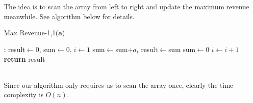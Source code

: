 \documentclass[12pt,letterpaper]{article}
\begin{document}
\section{}
\subsection{}
The idea is to scan the array from left to right and update the maximum revenue meanwhile.
See algorithm below for details.
\begin{algorithm}
  \caption{Max Revenue-1,1($\boldsymbol{a}$)}\label{alg:mr11}
  \begin{algorithmic}[1]
  :
  \State result$\gets0$, sum$\gets0$, $i\gets1$ 
  \State sum$\gets$sum+$a_i$
  \State result$\gets$sum
  \EndIf
  \State sum$\gets$0
  \EndIf
  \State $i\gets i+1$
  \EndWhile
  \State \textbf{return} result
  \EndProcedure
  \end{algorithmic}
\end{algorithm}\\
Since our algorithm only requires us to scan the array once,
clearly the time complexity is $O(n)$.

\newpage
\end{document}
